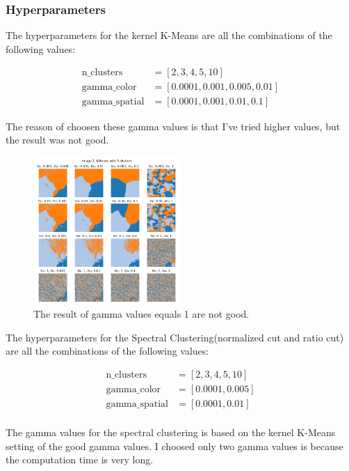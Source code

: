 \documentclass{homework}
\begin{document}
\subsubsection{Hyperparameters}

The hyperparameters for the kernel K-Means are all the combinations of the following values:

\begin{align*}
\text{n\_clusters} &= [2, 3, 4, 5, 10] \\
\text{gamma\_color} &= [0.0001, 0.001, 0.005, 0.01] \\
\text{gamma\_spatial} &= [0.0001, 0.001, 0.01, 0.1]
\end{align*}

The reason of choosen these gamma values is that I've tried higher values, but the result was not good.

\begin{figure}[H]
    \centering
    \includegraphics[width=0.5\textwidth]{image1_kmeans-3}
    \caption{The result of gamma values equals 1 are not good.}
\end{figure}

The hyperparameters for the Spectral Clustering(normalized cut and ratio cut) are all the combinations of the following values:

\begin{align*}
\text{n\_clusters} &= [2, 3, 4, 5, 10] \\
\text{gamma\_color} &= [0.0001, 0.005] \\
\text{gamma\_spatial} &= [0.0001, 0.01] \\
\end{align*}

The gamma values for the spectral clustering is based on the kernel K-Means setting of the good gamma values.
I choosed only two gamma values is because the computation time is very long.
\end{document}
